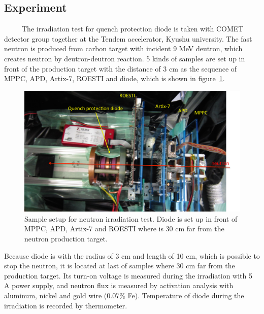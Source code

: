   \subsection{Experiment}
~~~~~The irradiation test for quench protection diode is taken with COMET detector group together at the Tendem accelerator, Kyushu university.
The fast neutron is produced from carbon target with incident 9 MeV deutron, which creates neutron by deutron-deutron reaction.
5 kinds of samples are set up in front of the production target with the distance of 3 cm as the sequence of MPPC, APD, Artix-7, ROESTI and diode, which is shown in figure~\ref{3setup}.
 \begin{figure}[H]
  \centering
  \includegraphics[scale=0.45]{chapter4/fig/diodepic.pdf}
  \caption{Sample setup for neutron irradiation test. Diode is set up in front of MPPC, APD, Artix-7 and ROESTI where is 30 cm far from the neutron production target.}
  \label{3setup}
 \end{figure}
Because diode is with the radius of 3 cm and length of 10 cm, which is possible to stop the neutron, it is located at last of samples where 30 cm far from the production target.
Its turn-on voltage is measured during the irradiation with 5 A power supply, and neutron flux is measured by activation analysis with aluminum, nickel and gold wire (0.07\% Fe).
Temperature of diode during the irradiation is recorded by thermometer.
  

